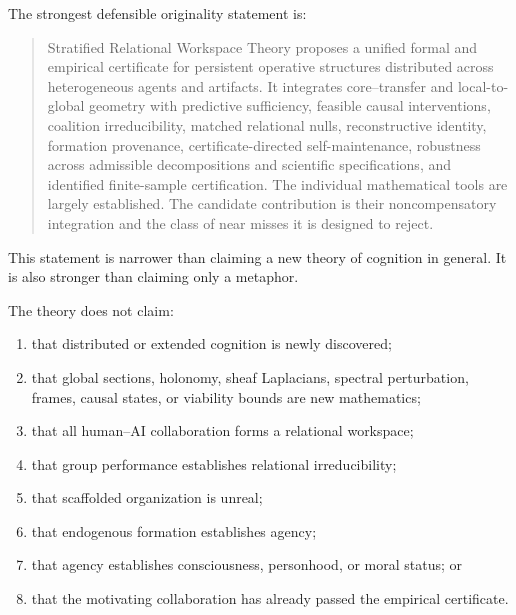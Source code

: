 

The strongest defensible originality statement is:
\begin{quote}
Stratified Relational Workspace Theory proposes a unified formal and empirical
certificate for persistent operative structures distributed across
heterogeneous agents and artifacts. It integrates core--transfer and
local-to-global geometry with predictive sufficiency, feasible causal
interventions, coalition irreducibility, matched relational nulls,
reconstructive identity, formation provenance, certificate-directed
self-maintenance, robustness across admissible decompositions and scientific
specifications, and identified finite-sample certification. The individual
mathematical tools are largely established.
The candidate contribution is their noncompensatory integration and the class
of near misses it is designed to reject.
\end{quote}
This statement is narrower than claiming a new theory of cognition in general.
It is also stronger than claiming only a metaphor.


The theory does not claim:
\begin{enumerate}
\item that distributed or extended cognition is newly discovered;
\item that global sections, holonomy, sheaf Laplacians, spectral perturbation,
 frames, causal states, or viability bounds are new mathematics;
\item that all human--AI collaboration forms a relational workspace;
\item that group performance establishes relational irreducibility;
\item that scaffolded organization is unreal;
\item that endogenous formation establishes agency;
\item that agency establishes consciousness, personhood, or moral status; or
\item that the motivating collaboration has already passed the empirical
 certificate.
\end{enumerate}


